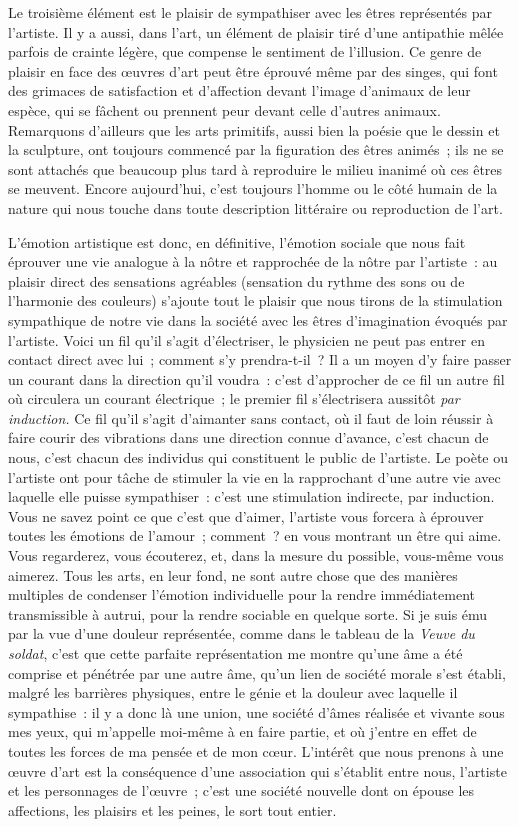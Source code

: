 \documentclass[french,twoside]{book} %
\begin{document}
Le troisième élément est le plaisir de sympathiser avec les êtres représentés par l’artiste. Il y a aussi, dans l’art, un élément de plaisir tiré d’une antipathie mêlée parfois de crainte légère, que compense le sentiment de l’illusion. Ce genre de plaisir en face des œuvres d’art peut être éprouvé même par des singes, qui font des grimaces de satisfaction et d’affection devant l’image d’animaux de leur espèce, qui se fâchent ou prennent peur devant celle d’autres animaux. Remarquons d’ailleurs que les arts primitifs, aussi bien la poésie que le dessin et la sculpture, ont toujours commencé par la figuration des êtres animés ; ils ne se sont attachés que beaucoup plus tard à reproduire le milieu inanimé où ces êtres se meuvent. Encore aujourd’hui, c’est toujours l’homme ou le côté humain de la nature qui nous touche dans toute description littéraire ou reproduction de l’art.\par
L’émotion artistique est donc, en définitive, l’émotion sociale que nous fait éprouver une vie analogue à la nôtre et rapprochée de la nôtre par l’artiste : au plaisir direct des sensations agréables (sensation du rythme des sons ou de l’harmonie des couleurs) s’ajoute tout le plaisir que nous tirons de la stimulation sympathique de notre vie dans la société avec les êtres d’imagination évoqués par l’artiste. Voici un fil qu’il s’agit d’électriser, le physicien ne peut pas entrer en contact direct avec lui ; comment s’y prendra-t-il ? Il a un moyen d’y faire passer un courant dans la direction qu’il voudra : c’est d’approcher de ce fil un autre fil où circulera un courant électrique ; le premier fil s’électrisera aussitôt \emph{par induction.} Ce fil qu’il s’agit d’aimanter sans contact, où il faut de loin réussir à faire courir des vibrations dans une direction connue d’avance, c’est chacun de nous, c’est chacun des individus qui constituent le public de l’artiste. Le poète ou l’artiste ont pour tâche de stimuler la vie en la rapprochant d’une autre vie avec laquelle elle puisse sympathiser : c’est une stimulation indirecte, par induction. Vous ne savez point ce que c’est que d’aimer, l’artiste vous forcera à éprouver toutes les émotions de l’amour ; comment ? en vous montrant un être qui aime. Vous regarderez, vous écouterez, et, dans la mesure du possible, vous-même vous aimerez. Tous les arts, en leur fond, ne sont autre chose que des manières multiples de condenser l’émotion individuelle pour la rendre immédiatement transmissible à autrui, pour la rendre sociable en quelque sorte. Si je suis ému par la vue d’une douleur représentée, comme dans le tableau de la \emph{Veuve du soldat}, c’est que cette parfaite représentation me montre qu’une âme a été comprise et pénétrée par une autre âme, qu’un lien de société morale s’est établi, malgré les barrières physiques, entre le génie et la douleur avec laquelle il sympathise : il y a donc là une union, une société d’âmes réalisée et vivante sous mes yeux, qui m’appelle moi-même à en faire partie, et où j’entre en effet de toutes les forces de ma pensée et de mon cœur. L’intérêt que nous prenons à une œuvre d’art est la conséquence d’une association qui s’établit entre nous, l’artiste et les personnages de l’œuvre ; c’est une société nouvelle dont on épouse les affections, les plaisirs et les peines, le sort tout entier.\par
\end{document}
